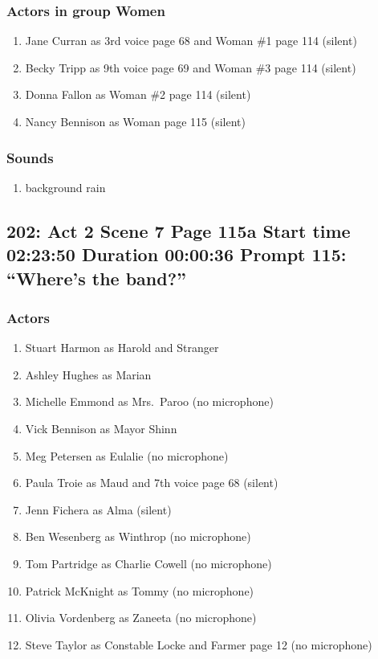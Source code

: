 \subsubsection{Actors in group Women}
\begin{enumerate}
\item Jane Curran as 3rd voice page 68 and Woman \#1 page 114 (silent)
\item Becky Tripp as 9th voice page 69 and Woman \#3 page 114 (silent)
\item Donna Fallon as Woman \#2 page 114 (silent)
\item Nancy Bennison as Woman page 115 (silent)
\end{enumerate}

\subsubsection{Sounds}
\begin{enumerate}
\item background rain
\end{enumerate}
\subsection{202: Act 2 Scene 7 Page 115a Start time 02:23:50 Duration 00:00:36 Prompt 115: ``Where's the band?''}

\subsubsection{Actors}
\begin{enumerate}
\item Stuart Harmon as Harold and Stranger
\item Ashley Hughes as Marian
\item Michelle Emmond as Mrs.~Paroo (no microphone)
\item Vick Bennison as Mayor Shinn
\item Meg Petersen as Eulalie (no microphone)
\item Paula Troie as Maud and 7th voice page 68 (silent)
\item Jenn Fichera as Alma (silent)
\item Ben Wesenberg as Winthrop (no microphone)
\item Tom Partridge as Charlie Cowell (no microphone)
\item Patrick McKnight as Tommy (no microphone)
\item Olivia Vordenberg as Zaneeta (no microphone)
\item Steve Taylor as Constable Locke and Farmer page 12 (no microphone)
\end{enumerate}

